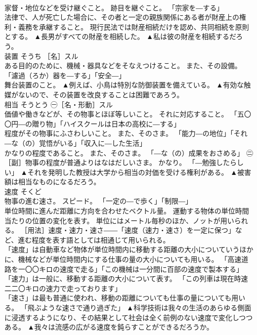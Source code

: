\documentclass[8pt]{extreport}
\begin{document}
\begin{CJK}{UTF8}{min}
\\	家督・地位などを受け継ぐこと。 跡目を継ぐこと。 「宗家を―する」 
\\	法律で、人が死亡した場合に、その者と一定の親族関係にある者が財産上の権利・義務を承継すること。 現行民法では財産相続だけを認め、共同相続を原則とする。	▲長男がすべての財産を相続した。 ▲私は彼の財産を相続するだろう。
\\	装置	そうち	［名］スル 
\\	ある目的のために、機械・器具などをそなえつけること。 また、その設備。 「濾過（ろか）器を―する」「安全―」 
\\	舞台装置のこと。	▲例えば、小鳥は特別な防御装置を備えている。 ▲有効な触媒がないので、その装置を改良することは困難であろう。
\\	相当	そうとう	㊀［名・形動］スル 
\\	価値や働きなどが、その物事とほぼ等しいこと。 それに対応すること。 「五〇〇円―の贈り物」「ハイスクールは日本の高校に―する」 
\\	程度がその物事にふさわしいこと。 また、そのさま。 「能力―の地位」「それ―な（の）覚悟がいる」「収入に―した生活」 
\\	かなりの程度であること。 また、そのさま。 「―な（の）成果をおさめる」 ㊁［副］物事の程度が普通よりはなはだしいさま。 かなり。 「―勉強したらしい」	▲それを発明した教授は大学から相当の対価を受ける権利がある。 ▲被害額は相当なものになるだろう。
\\	速度	そくど	
\\	物事の進む速さ。 スピード。 「一定の―で歩く」「制限―」 
\\	単位時間に進んだ距離に方向を合わせたベクトル量。 運動する物体の単位時間当たりの位置の変化を表す。 単位にはメートル毎秒のほか、ノットが用いられる。 ［用法］速度・速力・速さ――「速度（速力・速さ）を一定に保つ」など、進む程度を表す語としては相通じて用いられる。 
\\	「速度」は自動車など物体が単位時間内に移動する距離の大小についていうほかに、機械などが単位時間内にする仕事の量の大小についても用いる。 「高速道路を一〇〇キロの速度で走る」「この機械は一分間に百部の速度で製本する」
\\	「速力」は一般に、移動する距離の大小について表す。 「この列車は現在時速二二〇キロの速力で走っております」
\\	「速さ」は最も普通に使われ、移動の距離についても仕事の量についても用いる。 「飛ぶような速さで通り過ぎた」	▲科学技術は我々の生活のあらゆる側面に浸透するようになり、その結果として社会は全く前例のない速度で変化しつつある。 ▲我々は流感の広がる速度を鈍らすことができるだろうか。

\end{CJK}
\end{document}
